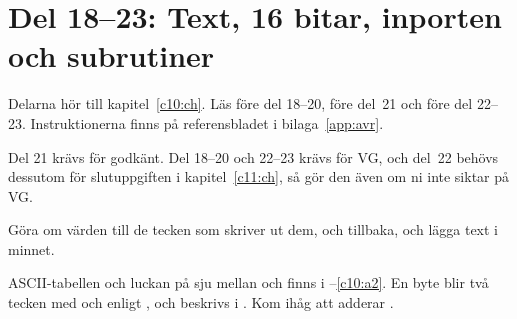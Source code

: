 
\section{Del 18--23: Text, 16 bitar, inporten och subrutiner}
\label{lab3:sec:d}
Delarna hör till kapitel~\ref{c10:ch}. Läs  före del 18--20, 
före del~21 och  före del 22--23. Instruktionerna finns på referensbladet i
bilaga~\ref{app:avr}.

Del 21 krävs för godkänt. Del 18--20 och 22--23 krävs för VG, och del~22 behövs dessutom för
slutuppgiften i kapitel~\ref{c11:ch}, så gör den även om ni inte siktar på VG.

\label{lab3:d18}
Göra om värden till de tecken som skriver ut dem, och tillbaka, och lägga text i minnet.

ASCII-tabellen och luckan på sju mellan  och  finns i
--\ref{c10:a2}. En byte blir två tecken med  och  enligt
, och  beskrivs i . Kom ihåg att 
adderar .

